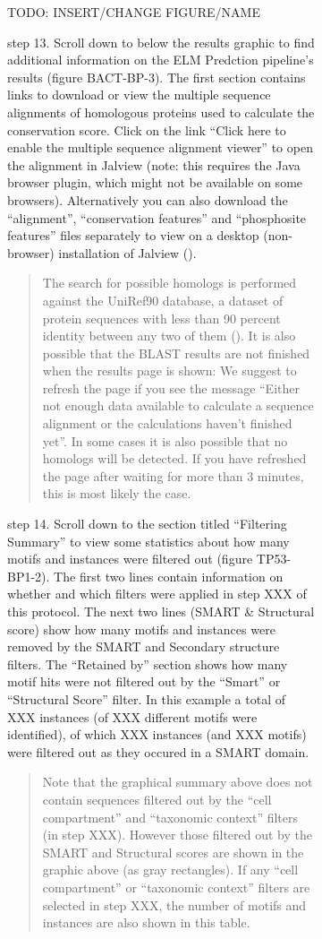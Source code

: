 {\begin{figure}[h!]
{{\begin{figure}[h!]
{{\begin{figure}[h!]
{}
\end{figure}
TODO: INSERT/CHANGE FIGURE/NAME

step 13. Scroll down to below the results graphic to find additional
information on the ELM Predction pipeline's results (figure BACT-BP-3).
The first section contains links to download or view the multiple
sequence alignments of homologous proteins used to calculate the
conservation score. Click on the link ``Click here to enable the
multiple sequence alignment viewer'' to open the alignment in Jalview
(note: this requires the Java browser plugin, which might not be
available on some browsers). Alternatively you can also download the
``alignment'', ``conservation features'' and ``phosphosite features''
files separately to view on a desktop (non-browser) installation of
Jalview (\cite{19151095}).

\begin{quote}
The search for possible homologs is performed against the UniRef90
database, a dataset of protein sequences with less than 90 percent
identity between any two of them (\cite{17379688}). It is also possible
that the BLAST results are not finished when the results page is shown:
We suggest to refresh the page if you see the message ``Either not
enough data available to calculate a sequence alignment or the
calculations haven't finished yet''. In some cases it is also possible
that no homologs will be detected. If you have refreshed the page after
waiting for more than 3 minutes, this is most likely the case.
\end{quote}

step 14. Scroll down to the section titled ``Filtering Summary'' to view
some statistics about how many motifs and instances were filtered out
(figure TP53-BP1-2). The first two lines contain information on whether
and which filters were applied in step XXX of this protocol. The next
two lines (SMART \& Structural score) show how many motifs and instances
were removed by the SMART and Secondary structure filters. The
``Retained by'' section shows how many motif hits were not filtered out
by the ``Smart'' or ``Structural Score'' filter. In this example a total
of XXX instances (of XXX different motifs were identified), of which XXX
instances (and XXX motifs) were filtered out as they occured in a SMART
domain.

\begin{quote}
Note that the graphical summary above does not contain sequences
filtered out by the ``cell compartment'' and ``taxonomic context''
filters (in step XXX). However those filtered out by the SMART and
Structural scores are shown in the graphic above (as gray rectangles).
If any ``cell compartment'' or ``taxonomic context'' filters are
selected in step XXX, the number of motifs and instances are also shown
in this table.
\end{quote}

}}
\end{figure}}}
\end{figure}}

